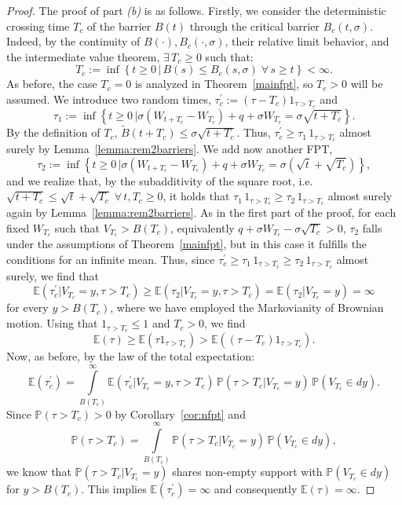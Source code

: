 \documentclass[10pt,a4paper]{amsart}
\begin{document}
\begin{proof}
The proof of part \textit{(b)} is as follows. Firstly, we consider the deterministic crossing time $T_c$ of the barrier $B(t)$ through the critical barrier $B_c(t,\sigma)$. Indeed, by the continuity of $B(\cdot),B_c(\cdot,\sigma)$, their relative limit behavior, and the intermediate value theorem, $\exists \, T_c \ge 0$ such that:
$$
T_c :=\inf \left\lbrace t\geq 0 \, \big\vert \, B(s) \le B_c(s,\sigma) \; \forall \, s \ge t \right\rbrace<\infty.
$$
As before, the case $T_c=0$ is analyzed in Theorem~\ref{mainfpt}, so $T_c>0$ will be assumed. We introduce two random times, $\tau^\prime_c:=(\tau-T_c)1_{\tau>T_c}$ and
$$
\tau_{1}:=\inf \left\lbrace t\geq 0 \, \big\vert \sigma(W_{t+T_c}-W_{T_c})+q+\sigma W_{T_c}=\sigma\sqrt{t+T_c}\right\rbrace.
$$
By the definition of $T_c$, $\tilde{B}(t+T_c)\leq \sigma\sqrt{t+T_c}$. Thus, $\tau^\prime_c \geq \tau_1 \, 1_{\tau>T_c}$ almost surely by Lemma~\ref{lemma:rem2barriers}. We add now another FPT,
$$
\tau_{2}:=\inf \left\lbrace t\geq 0 \, \big\vert \sigma(W_{t+T_c}-W_{T_c})+q+\sigma W_{T_c}=\sigma\left(\sqrt{t}+\sqrt{T_c}\right)\right\rbrace,
$$
and we realize that, by the subadditivity of the square root, i.e. $\sqrt{t+T_c}\leq \sqrt{t}+\sqrt{T_c}\;\forall \, t,T_c\geq 0$, it holds that $\tau_1 \, 1_{\tau>T_c} \geq \tau_2 \, 1_{\tau>T_c}$ almost surely again by Lemma~\ref{lemma:rem2barriers}. As in the first part of the proof, for each fixed $W_{T_c}$ such that $V_{T_c} > B(T_c)$, equivalently $q+\sigma W_{T_c}-\sigma\sqrt{T_c}>0$, $\tau_2$ falls under the assumptions of Theorem~\ref{mainfpt}, but in this case it fulfills the conditions for an infinite mean. Thus, since $\tau^\prime_c \geq \tau_1 \, 1_{\tau>T_c} \geq \tau_2 \, 1_{\tau>T_c}$ almost surely, we find that
$$
\mathbb{E}(\tau^\prime_c\vert V_{T_c}=y,\tau>T_c) \geq \mathbb{E}(\tau_2\vert V_{T_c}=y,\tau>T_c) = \mathbb{E}(\tau_2\vert V_{T_c}=y)= \infty
$$
for every $y>B(T_c)$, where we have employed the Markovianity of Brownian motion.
Using that $1_{\tau>T_c}\leq 1$ and $T_c > 0$, we find
\begin{equation}\nonumber
\mathbb{E}(\tau) \ge \mathbb{E}(\tau 1_{\tau>T_c}) > \mathbb{E}((\tau-T_c) 1_{\tau>T_c}).
\end{equation}
Now, as before, by the law of the total expectation:
\begin{equation}\nonumber
\mathbb{E}(\tau^\prime_c) = \int\limits_{B(T_c)}^\infty \mathbb{E}(\tau^\prime_c \vert V_{T_c}=y,\tau>T_c) \, \mathbb{P}(\tau>T_c\vert V_{T_c}=y) \, \mathbb{P}(V_{T_c} \in dy).
\end{equation}
Since $\mathbb{P}(\tau > T_c) >0$  by Corollary~\ref{cor:nfpt} and
$$
\mathbb{P}(\tau > T_c)=\int\limits_{B(T_c)}^\infty \mathbb{P}(\tau>T_c\vert V_{T_c}=y) \, \mathbb{P}(V_{T_c}\in dy),
$$
we know that $\mathbb{P}(\tau>T_c\vert V_{T_c}=y)$ shares non-empty support with $\mathbb{P}(V_{T_c}\in dy)$ for $y>B(T_c)$. This implies $\mathbb{E}(\tau^\prime_c)=\infty$ and consequently $\mathbb{E}(\tau)=\infty$.
\end{proof}
\end{document}
